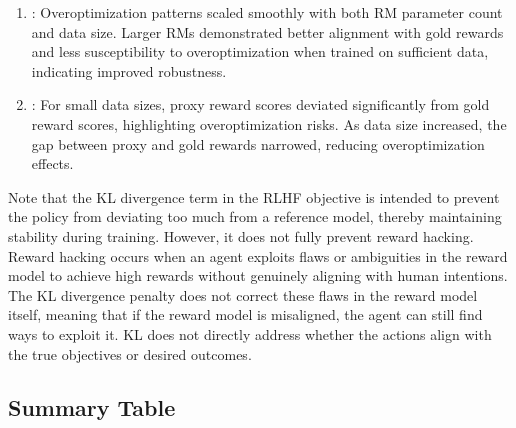 \documentclass[letterpaper,11pt,english]{sphinxmanual}
\begin{document}
\begin{itemize}
\begin{enumerate}
\item {} 
\sphinxAtStartPar
{}: Overoptimization
patterns scaled smoothly with both RM parameter count and data
size. Larger RMs demonstrated better alignment with gold rewards
and less susceptibility to overoptimization when trained on
sufficient data, indicating improved robustness.

\item {} 
\sphinxAtStartPar
{}: For small data sizes, proxy
reward scores deviated significantly from gold reward scores,
highlighting overoptimization risks. As data size increased, the
gap between proxy and gold rewards narrowed, reducing
overoptimization effects.

\end{enumerate}

\end{itemize}

\sphinxAtStartPar
Note that the KL divergence term in the RLHF objective is intended to
prevent the policy from deviating too much from a reference model,
thereby maintaining stability during training. However, it does not
fully prevent reward hacking. Reward hacking occurs when an agent
exploits flaws or ambiguities in the reward model to achieve high
rewards without genuinely aligning with human intentions. The KL
divergence penalty does not correct these flaws in the reward model
itself, meaning that if the reward model is misaligned, the agent can
still find ways to exploit it. KL does not directly address whether the
actions align with the true objectives or desired outcomes.


\subsection{Summary Table}
\label{\detokenize{finetuning:summary-table}}
\end{document}

